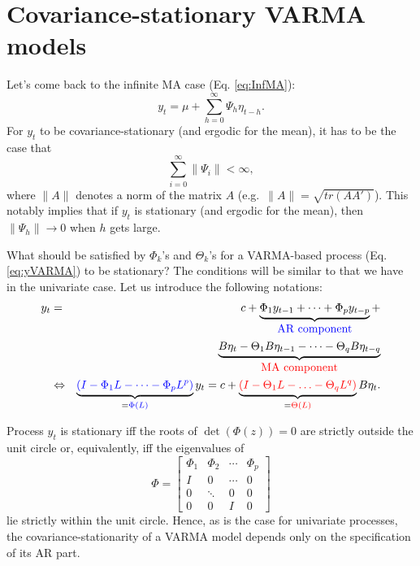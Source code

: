 \documentclass[
  12pt,
]{book}
\theoremstyle{definition}
\theoremstyle{definition}
\theoremstyle{definition}
\theoremstyle{definition}
\theoremstyle{remark}
\begin{document}
\hypertarget{covariance-stationary-varma-models}{%
\section{Covariance-stationary VARMA models}\label{covariance-stationary-varma-models}}

Let's come back to the infinite MA case (Eq. \eqref{eq:InfMA}):
\[
y_t = \mu + \sum_{h=0}^\infty \Psi_{h} \eta_{t-h}.
\]
For \(y_t\) to be covariance-stationary (and ergodic for the mean), it has to be the case that
\begin{equation}
\sum_{i=0}^\infty \|\Psi_i\| < \infty,\label{eq:condiInfiniteMA}
\end{equation}
where \(\|A\|\) denotes a norm of the matrix \(A\) (e.g.~\(\|A\|=\sqrt{tr(AA')}\)). This notably implies that if \(y_t\) is stationary (and ergodic for the mean), then \(\|\Psi_h\|\rightarrow 0\) when \(h\) gets large.

What should be satisfied by \(\Phi_k\)'s and \(\Theta_k\)'s for a VARMA-based process (Eq. \eqref{eq:yVARMA}) to be stationary? The conditions will be similar to that we have in the univariate case. Let us introduce the following notations:
\begin{eqnarray}
y_t &=& c + \underbrace{\Phi_1 y_{t-1} + \dots +\Phi_p y_{t-p}}_{\color{blue}{\mbox{AR component}}} +  \label{eq:VARMA2}\\
&&\underbrace{B \eta_t - \Theta_1 B \eta_{t-1} - \dots - \Theta_q B \eta_{t-q}}_{\color{red}{\mbox{MA component}}} \nonumber\\
&\Leftrightarrow& \underbrace{ \color{blue}{(I - \Phi_1 L - \dots - \Phi_p L^p)}}_{= \color{blue}{\Phi(L)}}y_t = c +  \underbrace{ \color{red}{(I - \Theta_1 L - \ldots - \Theta_q L^q)}}_{=\color{red}{\Theta(L)}} B \eta_{t}. \nonumber
\end{eqnarray}

Process \(y_t\) is stationary iff the roots of \(\det(\Phi(z))=0\) are strictly outside the unit circle or, equivalently, iff the eigenvalues of
\begin{equation}
\Phi = \left[\begin{array}{cccc}
\Phi_{1} & \Phi_{2} & \cdots & \Phi_{p}\\
I & 0 & \cdots & 0\\
0 & \ddots & 0 & 0\\
0 & 0 & I & 0\end{array}\right]\label{eq:matrixPHI}
\end{equation}
lie strictly within the unit circle. Hence, as is the case for univariate processes, the covariance-stationarity of a VARMA model depends only on the specification of its AR part.
\end{document}
